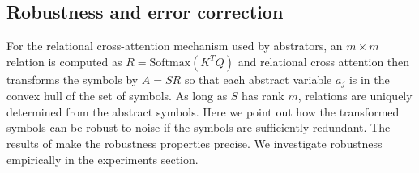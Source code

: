 \subsection{Robustness and error correction}

For the relational cross-attention mechanism used by abstrators, an \(m\times m\) relation
is computed as  \(R = \mbox{Softmax}(K^T Q)\)
and relational cross attention then transforms the symbols by
\(A = SR\) so that each abstract variable \(a_j\) is in the convex hull of the set of symbols.
As long as \(S\) has rank \(m\), relations are uniquely determined from the abstract symbols.
Here we point out how the transformed symbols can be robust to noise if the symbols are
sufficiently redundant. The results of \cite{model_repair} make the robustness properties precise. We investigate robustness empirically in the experiments section.




